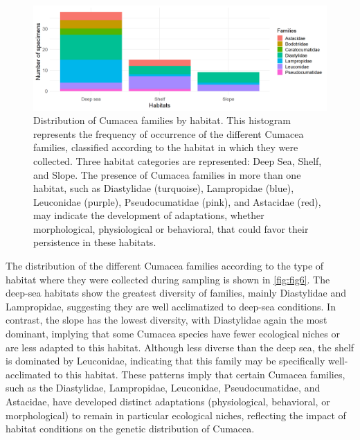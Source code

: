 \begin{figure}[htbp]
    \centering
    \includegraphics[width=\textwidth]{figure4.png}
    \caption{Distribution of Cumacea families by habitat. This histogram represents the frequency of occurrence of the different Cumacea families, classified according to the habitat in which they were collected. Three habitat categories are represented: Deep Sea, Shelf, and Slope. The presence of Cumacea families in more than one habitat, such as Diastylidae (turquoise), Lampropidae (blue), Leuconidae (purple), Pseudocumatidae (pink), and Astacidae (red), may indicate the development of adaptations, whether morphological, physiological or behavioral, that could favor their persistence in these habitats. \label{fig:fig6}}
\end{figure}

The distribution of the different Cumacea families according to the type of habitat where they were collected during sampling is shown in \autoref{fig:fig6}. The deep-sea habitats show the greatest diversity of families, mainly Diastylidae and Lampropidae, suggesting they are well acclimatized to deep-sea conditions. In contrast, the slope has the lowest diversity, with Diastylidae again the most dominant, implying that some Cumacea species have fewer ecological niches or are less adapted to this habitat. Although less diverse than the deep sea, the shelf is dominated by Leuconidae, indicating that this family may be specifically well-acclimated to this habitat. These patterns imply that certain Cumacea families, such as the Diastylidae, Lampropidae, Leuconidae, Pseudocumatidae, and Astacidae, have developed distinct adaptations (physiological, behavioral, or morphological) to remain in particular ecological niches, reflecting the impact of habitat conditions on the genetic distribution of Cumacea.

